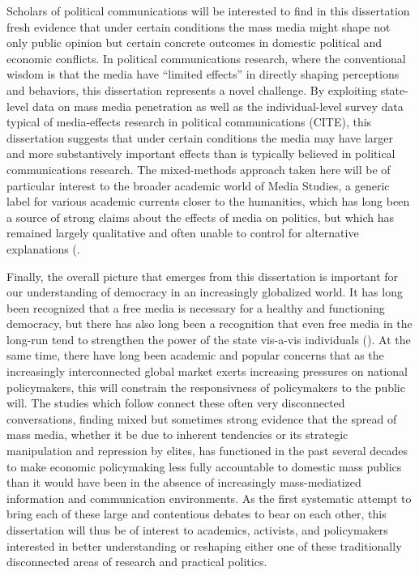 \documentclass[12pt]{report}
\begin{document}
Scholars of political communications will be interested to find in this dissertation fresh evidence that under certain conditions the mass media might shape not only public opinion but certain concrete outcomes in domestic political and economic conflicts. In political communications research, where the conventional wisdom is that the media have ``limited effects'' in directly shaping perceptions and behaviors, this dissertation represents a novel challenge. By exploiting state-level data on mass media penetration as well as the individual-level survey data typical of media-effects research in political communications (CITE), this dissertation suggests that under certain conditions the media may have larger and more substantively important effects than is typically believed in political communications research. The mixed-methods approach taken here will be of particular interest to the broader academic world of Media Studies, a generic label for various academic currents closer to the humanities, which has long been a source of strong claims about the effects of media on politics, but which has remained largely qualitative and often unable to control for alternative explanations (\citealt{Debord:1967vn,McLuhan:1994tf,Chomsky:1991ty}. 

Finally, the overall picture that emerges from this dissertation is important for our understanding of democracy in an increasingly globalized world. It has long been recognized that a free media is necessary for a healthy and functioning democracy, but there has also long been a recognition that even free media in the long-run tend to strengthen the power of the state vis-a-vis individuals (\citealt{Deutsch:1953ww,Deutsch:1966ux,Camber:2013ul}). At the same time, there have long been academic and popular concerns that as the increasingly interconnected global market exerts increasing pressures on national policymakers, this will constrain the responsivness of policymakers to the public will. The studies which follow connect these often very disconnected conversations, finding mixed but sometimes strong evidence that the spread of mass media, whether it be due to inherent tendencies or its strategic manipulation and repression by elites, has functioned in the past several decades to make economic policymaking less fully accountable to domestic mass publics than it would have been in the absence of increasingly mass-mediatized information and communication environments. As the first systematic attempt to bring each of these large and contentious debates to bear on each other, this dissertation will thus be of interest to academics, activists, and policymakers interested in better understanding or reshaping either one of these traditionally disconnected areas of research and practical politics. 
\end{document}
